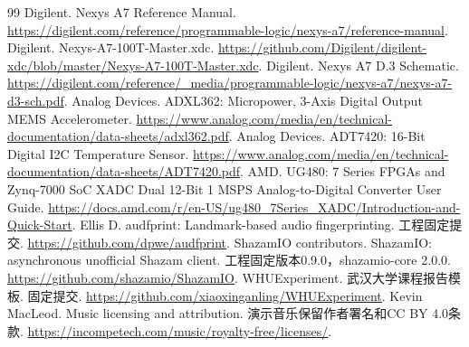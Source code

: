 \begin{thebibliography}{99}
\small\setlength{\itemsep}{4pt}
 Digilent. Nexys A7 Reference Manual. \url{https://digilent.com/reference/programmable-logic/nexys-a7/reference-manual}.
 Digilent. Nexys-A7-100T-Master.xdc. \url{https://github.com/Digilent/digilent-xdc/blob/master/Nexys-A7-100T-Master.xdc}.
 Digilent. Nexys A7 D.3 Schematic. \url{https://digilent.com/reference/_media/programmable-logic/nexys-a7/nexys-a7-d3-sch.pdf}.
 Analog Devices. ADXL362: Micropower, 3-Axis Digital Output MEMS Accelerometer. \url{https://www.analog.com/media/en/technical-documentation/data-sheets/adxl362.pdf}.
 Analog Devices. ADT7420: 16-Bit Digital I2C Temperature Sensor. \url{https://www.analog.com/media/en/technical-documentation/data-sheets/ADT7420.pdf}.
 AMD. UG480: 7 Series FPGAs and Zynq-7000 SoC XADC Dual 12-Bit 1 MSPS Analog-to-Digital Converter User Guide. \url{https://docs.amd.com/r/en-US/ug480_7Series_XADC/Introduction-and-Quick-Start}.
 Ellis D. audfprint: Landmark-based audio fingerprinting. 工程固定提交. \url{https://github.com/dpwe/audfprint}.
 ShazamIO contributors. ShazamIO: asynchronous unofficial Shazam client. 工程固定版本0.9.0，shazamio-core 2.0.0. \url{https://github.com/shazamio/ShazamIO}.
 WHUExperiment. 武汉大学课程报告模板. 固定提交. \url{https://github.com/xiaoxinganling/WHUExperiment}.
 Kevin MacLeod. Music licensing and attribution. 演示音乐保留作者署名和CC BY 4.0条款. \url{https://incompetech.com/music/royalty-free/licenses/}.
\end{thebibliography}
